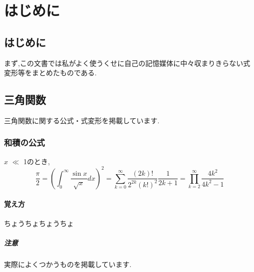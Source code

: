 \documentclass[]{jreport}
\begin{document}
\part{はじめに}
\chapter{はじめに}

まず,この文書では私がよく使うくせに自己の記憶媒体に中々収まりきらない式変形等をまとめたものである.

\chapter{三角関数}

三角関数に関する公式・式変形を掲載しています.

\section{和積の公式}

$x$ $\ll$ 1のとき,
\begin{equation}
    \frac{\pi}{2} =
    \left( \int_{0}^{\infty} \frac{\sin x}{\sqrt{x}} dx \right)^2 =
    \sum_{k=0}^{\infty} \frac{(2k)!}{2^{2k}(k!)^2} \frac{1}{2k+1} =
    \prod_{k=2}^{\infty} \frac{4k^2}{4k^2 - 1}
\end{equation}

\subsection{覚え方}

ちょうちょちょうちょ

\subsubsection{注意}

実際によくつかうものを掲載しています.
\end{document}
